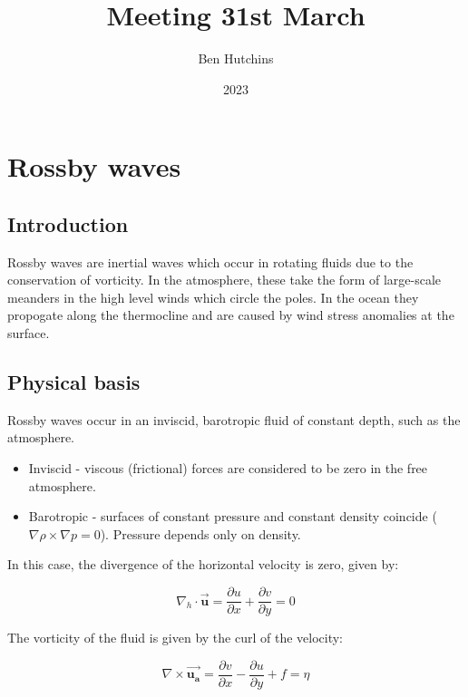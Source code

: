 \documentclass{article}
\title{Meeting 31st March}
\author{Ben Hutchins}
\date{2023}
\begin{document}
\maketitle

\section*{Rossby waves}

\subsection*{Introduction}

Rossby waves are inertial waves which occur in rotating fluids due to the conservation of vorticity. In the atmosphere, these take the form of large-scale meanders in the high level winds which circle the poles. In the ocean they propogate along the thermocline and are caused by wind stress anomalies at the surface.

\subsection*{Physical basis}

Rossby waves occur in an inviscid, barotropic fluid of constant depth, such as the atmosphere.

\begin{itemize}
    \item Inviscid - viscous (frictional) forces are considered to be zero in the free atmosphere.
    \item Barotropic - surfaces of constant pressure and constant density coincide ($\nabla \rho \times \nabla p = 0$). Pressure depends only on density. 
\end{itemize}

In this case, the divergence of the horizontal velocity is zero, given by:

\begin{equation}
    \nabla_h \cdot \mathbf{\vec{u}} = \frac{\partial u}{\partial x} + \frac{\partial v}{\partial y} = 0
    \label{eq:divergence}
\end{equation}

The vorticity of the fluid is given by the curl of the velocity:

\begin{equation}
    \nabla \times \mathbf{\vec{u_a}} = \frac{\partial v}{\partial x} - \frac{\partial u}{\partial y} + f  = {\eta}
    \label{eq:absolute_vorticity}
\end{equation}
\end{document}
